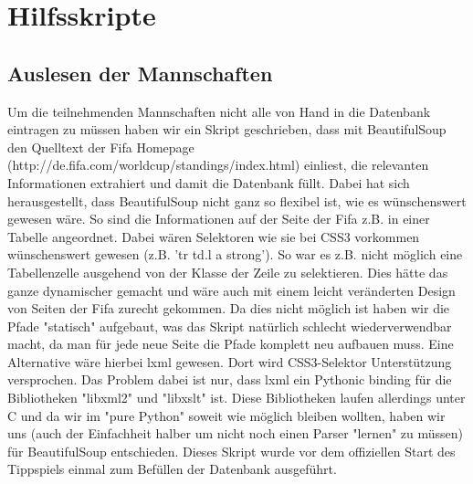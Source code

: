 \chapter{Hilfsskripte}
\section{Auslesen der Mannschaften}
Um die teilnehmenden Mannschaften nicht alle von Hand in die Datenbank
eintragen  zu müssen haben wir ein Skript geschrieben, dass mit BeautifulSoup 
den Quelltext der Fifa Homepage 
(http://de.fifa.com/worldcup/standings/index.html) einliest, die relevanten 
Informationen extrahiert und damit die Datenbank füllt. Dabei hat sich 
herausgestellt, dass BeautifulSoup nicht ganz so flexibel ist, wie es 
wünschenswert gewesen wäre. So sind die Informationen auf der Seite der Fifa 
z.B. in einer Tabelle angeordnet. Dabei wären Selektoren wie sie bei CSS3 
vorkommen wünschenswert gewesen (z.B. 'tr td.l a strong'). So war es z.B. nicht
möglich eine Tabellenzelle ausgehend von der Klasse der Zeile zu selektieren. 
Dies hätte das ganze dynamischer gemacht und wäre auch mit einem leicht 
veränderten Design von Seiten der Fifa zurecht gekommen. Da dies nicht möglich 
ist haben wir die Pfade "statisch" aufgebaut, was das Skript natürlich schlecht
wiederverwendbar macht, da man für jede neue Seite die Pfade komplett neu 
aufbauen muss. Eine Alternative wäre hierbei lxml gewesen. Dort wird 
CSS3-Selektor Unterstützung versprochen. Das Problem dabei ist nur, dass lxml 
ein Pythonic binding für die Bibliotheken "libxml2" und "libxslt" ist. Diese 
Bibliotheken laufen allerdings unter C und da wir im "pure Python" soweit wie 
möglich bleiben wollten, haben wir uns (auch der Einfachheit halber um nicht 
noch einen Parser "lernen" zu müssen) für BeautifulSoup entschieden. Dieses 
Skript wurde vor dem offiziellen Start des Tippspiels einmal zum Befüllen der 
Datenbank ausgeführt.

